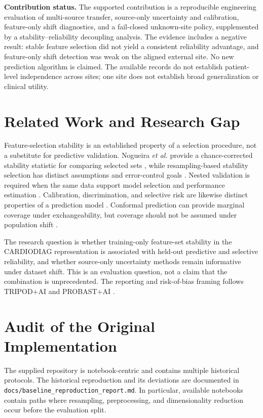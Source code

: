 \documentclass[12pt]{article}
\begin{document}
\textbf{Contribution status.} The supported contribution is a reproducible
engineering evaluation of multi-source transfer, source-only uncertainty and
calibration, feature-only shift diagnostics, and a fail-closed unknown-site
policy, supplemented by a stability--reliability decoupling analysis. The
evidence includes a negative result: stable feature selection did not yield a
consistent reliability advantage, and feature-only shift detection was weak on
  the aligned external site. No new prediction algorithm is claimed. The available
  records do not establish patient-level independence across sites; one site does
  not establish broad generalization or clinical utility.

\section{Related Work and Research Gap}
Feature-selection stability is an established property of a selection procedure,
not a substitute for predictive validation. Nogueira \emph{et al.} provide a
chance-corrected stability statistic for comparing selected sets
\cite{nogueira2018stability}, while resampling-based stability selection has
distinct assumptions and error-control goals \cite{meinshausen2010stability}.
Nested validation is required when the same data support model selection and
performance estimation \cite{varma2006bias,cawley2010overfitting}. Calibration,
discrimination, and selective risk are likewise distinct properties of a
prediction model \cite{vancalster2019calibration}. Conformal prediction can
provide marginal coverage under exchangeability, but coverage should not be
assumed under population shift \cite{angelopoulos2023conformal}.

The research question is whether training-only feature-set stability in the
CARDIODIAG representation is associated with held-out predictive and selective
reliability, and whether source-only uncertainty methods remain informative
under dataset shift. This is an evaluation question, not a claim that the
combination is unprecedented. The reporting and risk-of-bias framing follows
TRIPOD+AI and PROBAST+AI
\cite{collins2024tripodai,moons2025probastai}.

\section{Audit of the Original Implementation}
The supplied repository is notebook-centric and contains multiple historical
protocols. The historical reproduction and its deviations are documented in
\texttt{docs/baseline\_reproduction\_report.md}. In particular, available
notebooks contain paths where resampling, preprocessing, and dimensionality
reduction occur before the evaluation split.
\end{document}
